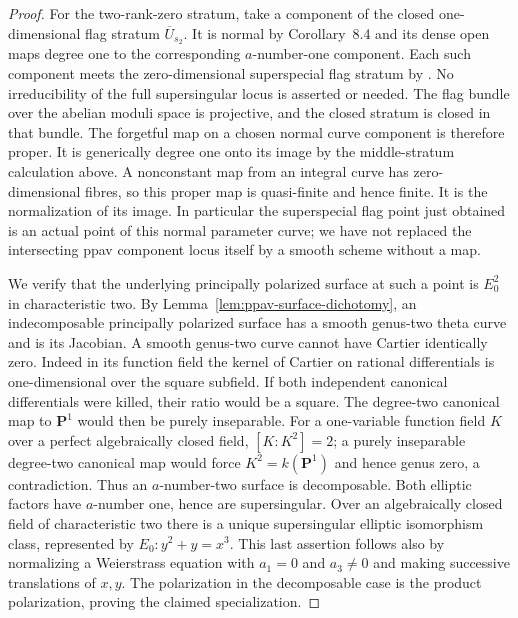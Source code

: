 \begin{proof}
For the two-rank-zero stratum, take a component of the
closed one-dimensional flag stratum $\overline U_{s_2}$.
It is normal by Corollary~8.4 and its dense open maps
degree one to the corresponding $a$-number-one component.
Each such component meets the zero-dimensional superspecial
flag stratum by
\cite[Proposition~6.1 and its proof, printed p.~601]{EkedahlVanderGeer2009Strata}.
No irreducibility of the full supersingular locus is asserted
or needed. The flag bundle over the abelian moduli space is
projective, and the closed stratum is closed in that bundle.
The forgetful map on a chosen normal curve component is
therefore proper. It is generically degree one onto its
image by the middle-stratum calculation above. A nonconstant map from an integral
curve has zero-dimensional fibres, so this proper map is
quasi-finite and hence finite. It is the normalization of
its image. In particular the superspecial flag point just
obtained is an actual point of this normal parameter curve;
we have not replaced the intersecting ppav component locus
itself by a smooth scheme without a map.

We verify that the underlying principally polarized surface
at such a point is $E_0^2$ in characteristic two. By
Lemma~\ref{lem:ppav-surface-dichotomy}, an indecomposable
principally polarized surface has a smooth genus-two theta
curve and is its Jacobian. A smooth genus-two curve cannot
have Cartier identically zero. Indeed in its function field
the kernel of Cartier on rational differentials is
one-dimensional over the square subfield. If both independent
canonical differentials were killed, their ratio would be a
square. The degree-two canonical map to $\mathbf P^1$
would then be purely inseparable. For a one-variable
function field $K$ over a perfect algebraically closed
field, $[K:K^2]=2$; a purely inseparable degree-two
canonical map would force $K^2=k(\mathbf P^1)$ and hence
genus zero, a contradiction.
Thus an $a$-number-two surface is decomposable. Both
elliptic factors have $a$-number one, hence are supersingular.
Over an algebraically closed field of characteristic two
there is a unique supersingular elliptic isomorphism class,
represented by $E_0:y^2+y=x^3$. This last assertion follows
also by normalizing a Weierstrass equation with $a_1=0$
and $a_3\ne0$ and making successive translations of $x,y$.
The polarization in the decomposable case is the product
polarization, proving the claimed specialization.


\end{proof}
